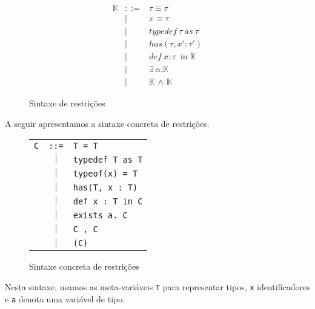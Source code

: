 \documentclass[a4paper,8pt]{article}
\begin{document}
     \begin{figure}[h]
        \[
             \begin{array}{lcl}
                 \mathbb{K} & ::= & \tau \equiv \tau \\
                                    & \mid & x \equiv \tau \\
                                    & \mid & typedef\:\tau\:as\:\tau \\
                                    & \mid & has(\tau, x' : \tau') \\
                                    & \mid & def\:x:\tau\:\text{ in
                                             }\mathbb{K}\\
                                    & \mid &
                                             \exists\,\alpha.\mathbb{K}\\
                                    & \mid & \mathbb{K}\,\land\,\mathbb{K}
             \end{array}
        \]
        \centering
        \caption{Sintaxe de restrições}
        \label{figconstrsyn}
      \end{figure}

      A seguir apresentamos a sintaxe concreta de restrições.

     \begin{figure}[h]
       \begin{tabular}{lcl}
          \texttt{C} & \texttt{::=} & \texttt{T = T} \\
                          & $\mid$     & \texttt{typedef T as T}\\
                          & $\mid$     & \texttt{typeof(x) = T}\\
                          & $\mid$     & \texttt{has(T, x : T)}\\
                          & $\mid$     & \texttt{def x : T in C}\\
                          & $\mid$     & \texttt{exists a. C}\\
                          & $\mid$     & \texttt{C , C}\\
                          & $\mid$     & \texttt{(C)}\\
       \end{tabular}
        \centering
        \caption{Sintaxe concreta de restrições}
        \label{concreta}
      \end{figure}

      Nesta sintaxe, usamos as meta-variáveis \texttt{T} para
      representar tipos, \texttt{x} identificadores e \texttt{a}
      denota uma variável de tipo.
\end{document}
